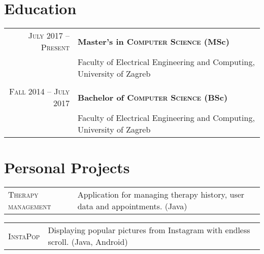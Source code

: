 \documentclass[a4paper,10pt]{article} %
\begin{document}
  \vspace{5mm}
  
  
  \section{Education}
  
  \begin{tabular}{rl}	
      \textsc{July 2017 -- Present}  & \textbf{Master's in \textsc{Computer Science} (MSc)} \\
                                     & \footnotesize{Faculty of Electrical Engineering and Computing, University of Zagreb} \\
                                     \\
      \textsc{Fall 2014 -- July 2017}  & \textbf{Bachelor of \textsc{Computer Science} (BSc)} \\
                                       & \footnotesize{Faculty of Electrical Engineering and Computing, University of Zagreb} \\
  \end{tabular}
  
  \vspace{5mm}
  
  
  \section{Personal Projects}
  
  \begin{tabular}{l|p{11cm}}
  \textsc{Therapy management} &
  \footnotesize{Application for managing therapy history, user data and appointments. (Java)}\\
  \end{tabular}
  
  \begin{tabular}{l|p{11cm}}
  \textsc{InstaPop} &
  \footnotesize{Displaying popular pictures from Instagram with endless scroll. (Java, Android)}\\
  \end{tabular}
  
\end{document}

